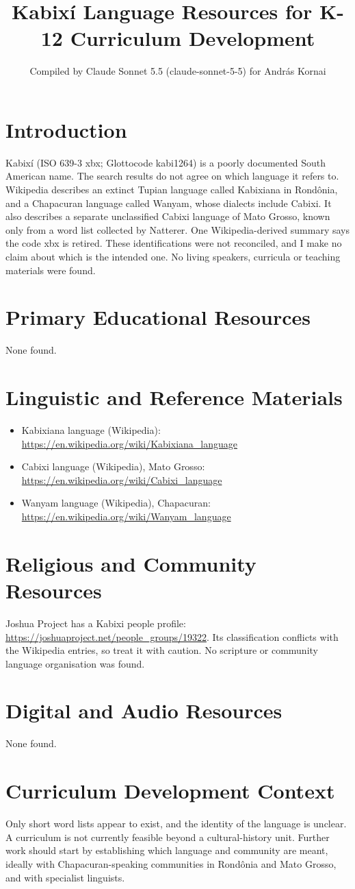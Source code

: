 \documentclass[12pt]{article}
\title{Kabix\'i Language Resources for K-12 Curriculum Development}
\author{Compiled by Claude Sonnet 5.5 (claude-sonnet-5-5) for Andr\'as Kornai}
\date{}
\begin{document}
\maketitle

\section{Introduction}
Kabix\'i (ISO 639-3 xbx; Glottocode kabi1264) is a poorly documented South American name. The search results do not agree on which language it refers to. Wikipedia describes an extinct Tupian language called Kabixiana in Rondônia, and a Chapacuran language called Wanyam, whose dialects include Cabixi. It also describes a separate unclassified Cabixi language of Mato Grosso, known only from a word list collected by Natterer. One Wikipedia-derived summary says the code xbx is retired. These identifications were not reconciled, and I make no claim about which is the intended one. No living speakers, curricula or teaching materials were found.

\section{Primary Educational Resources}
None found.

\section{Linguistic and Reference Materials}
\begin{itemize}
\item Kabixiana language (Wikipedia): \url{https://en.wikipedia.org/wiki/Kabixiana_language}
\item Cabixi language (Wikipedia), Mato Grosso: \url{https://en.wikipedia.org/wiki/Cabixi_language}
\item Wanyam language (Wikipedia), Chapacuran: \url{https://en.wikipedia.org/wiki/Wanyam_language}
\end{itemize}

\section{Religious and Community Resources}
Joshua Project has a Kabixi people profile: \url{https://joshuaproject.net/people_groups/19322}. Its classification conflicts with the Wikipedia entries, so treat it with caution. No scripture or community language organisation was found.

\section{Digital and Audio Resources}
None found.

\section{Curriculum Development Context}
Only short word lists appear to exist, and the identity of the language is unclear. A curriculum is not currently feasible beyond a cultural-history unit. Further work should start by establishing which language and community are meant, ideally with Chapacuran-speaking communities in Rondônia and Mato Grosso, and with specialist linguists.
\end{document}
